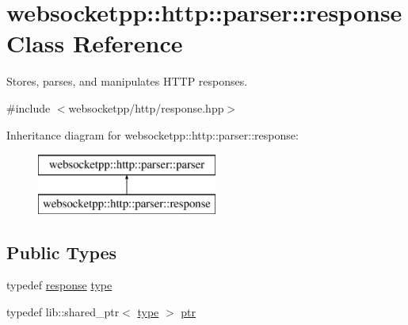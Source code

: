 \hypertarget{classwebsocketpp_1_1http_1_1parser_1_1response}{}\section{websocketpp\+:\+:http\+:\+:parser\+:\+:response Class Reference}
\label{classwebsocketpp_1_1http_1_1parser_1_1response}


Stores, parses, and manipulates H\+T\+T\+P responses.  




{\ttfamily \#include $<$websocketpp/http/response.\+hpp$>$}

Inheritance diagram for websocketpp\+:\+:http\+:\+:parser\+:\+:response\+:\begin{figure}[H]
\begin{center}
\leavevmode
\includegraphics[height=2.000000cm]{classwebsocketpp_1_1http_1_1parser_1_1response}
\end{center}
\end{figure}
\subsection*{Public Types}
\begin{DoxyCompactItemize}
\item 
typedef \hyperlink{classwebsocketpp_1_1http_1_1parser_1_1response}{response} \hyperlink{classwebsocketpp_1_1http_1_1parser_1_1response_ac8666204343c97725f35fd1aa8573c2b}{type}
\item 
typedef lib\+::shared\+\_\+ptr$<$ \hyperlink{classwebsocketpp_1_1http_1_1parser_1_1response_ac8666204343c97725f35fd1aa8573c2b}{type} $>$ \hyperlink{classwebsocketpp_1_1http_1_1parser_1_1response_a4072a02adfa5e60b4e23246d561d9c25}{ptr}
\end{DoxyCompactItemize}
